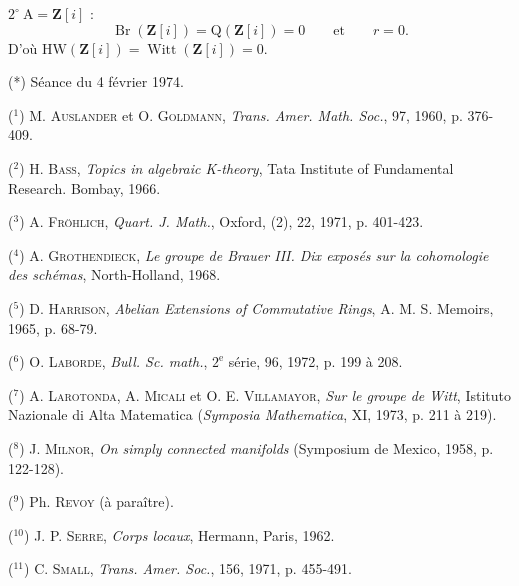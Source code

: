 
$2^\circ\ \mathrm{A}=\mathbf{Z}[i]$ :
\[
\operatorname{Br}(\mathbf{Z}[i])=\mathrm{Q}(\mathbf{Z}[i])=0\qquad\text{et}\qquad r=0.
\]
D'où $\mathrm{HW}(\mathbf{Z}[i])=\operatorname{Witt}(\mathbf{Z}[i])=0$.

(*) Séance du 4 février 1974.

(${}^1$) M. \textsc{Auslander} et O. \textsc{Goldmann}, \textit{Trans. Amer. Math. Soc.}, 97, 1960, p. 376-409.

(${}^2$) H. \textsc{Bass}, \textit{Topics in algebraic K-theory}, Tata Institute of Fundamental Research. Bombay, 1966.

(${}^3$) A. \textsc{Fröhlich}, \textit{Quart. J. Math.}, Oxford, (2), 22, 1971, p. 401-423.

(${}^4$) A. \textsc{Grothendieck}, \textit{Le groupe de Brauer III. Dix exposés sur la cohomologie des schémas}, North-Holland, 1968.

(${}^5$) D. \textsc{Harrison}, \textit{Abelian Extensions of Commutative Rings}, A. M. S. Memoirs, 1965, p. 68-79.

(${}^6$) O. \textsc{Laborde}, \textit{Bull. Sc. math.}, $2^{\mathrm e}$ série, 96, 1972, p. 199 à 208.

(${}^7$) A. \textsc{Larotonda}, A. \textsc{Micali} et O. E. \textsc{Villamayor}, \textit{Sur le groupe de Witt}, Istituto Nazionale di Alta Matematica (\textit{Symposia Mathematica}, XI, 1973, p. 211 à 219).

(${}^8$) J. \textsc{Milnor}, \textit{On simply connected manifolds} (Symposium de Mexico, 1958, p. 122-128).

(${}^9$) Ph. \textsc{Revoy} (à paraître).

(${}^{10}$) J. P. \textsc{Serre}, \textit{Corps locaux}, Hermann, Paris, 1962.

(${}^{11}$) C. \textsc{Small}, \textit{Trans. Amer. Soc.}, 156, 1971, p. 455-491.

